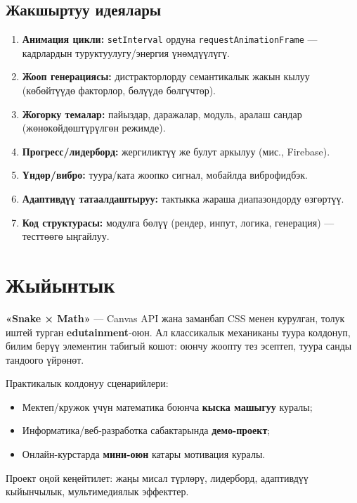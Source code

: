 \documentclass{article}
\begin{document}
\subsection*{Жакшыртуу идеялары}
\begin{enumerate}
  \item \textbf{Анимация цикли:} \texttt{setInterval} ордуна \texttt{requestAnimationFrame} — кадрлардын туруктуулугу/энергия үнөмдүүлүгү.
  \item \textbf{Жооп генерациясы:} дистракторлорду семантикалык жакын кылуу (көбөйтүүдө факторлор, бөлүүдө бөлгүчтөр).
  \item \textbf{Жогорку темалар:} пайыздар, даражалар, модуль, аралаш сандар (жөнөкөйдөштүрүлгөн режимде).
  \item \textbf{Прогресс/лидерборд:} жергиликтүү же булут аркылуу (мис., Firebase).
  \item \textbf{Үндөр/вибро:} туура/ката жоопко сигнал, мобайлда виброфидбэк.
  \item \textbf{Адаптивдүү татаалдаштыруу:} тактыкка жараша диапазондорду өзгөртүү.
  \item \textbf{Код структурасы:} модулга бөлүү (рендер, инпут, логика, генерация) — тесттөөгө ыңгайлуу.
\end{enumerate}

\section{Жыйынтык}
\textbf{«Snake × Math»} — Canvas API жана заманбап CSS менен курулган, толук иштей турган \textbf{edutainment}-оюн. Ал классикалык механиканы туура колдонуп, билим берүү элементин табигый кошот: оюнчу жоопту тез эсептеп, туура санды тандоого үйрөнөт.

Практикалык колдонуу сценарийлери:
\begin{itemize}
  \item Мектеп/кружок үчүн математика боюнча \textbf{кыска машыгуу} куралы;
  \item Информатика/веб-разработка сабактарында \textbf{демо-проект};
  \item Онлайн-курстарда \textbf{мини-оюн} катары мотивация куралы.
\end{itemize}
Проект оңой кеңейтилет: жаңы мисал түрлөрү, лидерборд, адаптивдүү кыйынчылык, мультимедиялык эффекттер.
\end{document}
